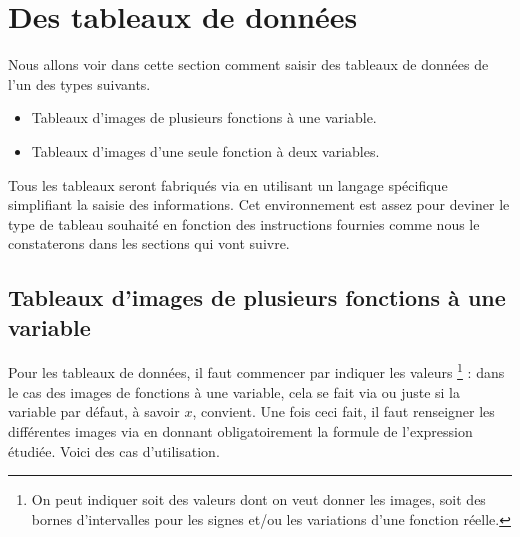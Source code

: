\newpage
\tableofcontents
\newpage
\section{Des tableaux de données}

Nous allons voir dans cette section comment saisir des tableaux de données de l'un des types suivants.
\begin{itemize}
	\item Tableaux d'images de plusieurs fonctions à une variable.

	\item Tableaux d'images d'une seule fonction à deux variables.
\end{itemize}


\begin{tdocnote}
	Tous les tableaux seront fabriqués via  en utilisant un langage spécifique simplifiant la saisie des informations.
	Cet environnement est assez  pour deviner le type de tableau souhaité en fonction des instructions fournies comme nous le constaterons dans les sections qui vont suivre.
\end{tdocnote}





\subsection{Tableaux d'images de plusieurs fonctions à une variable}

Pour les tableaux de données, il faut commencer par indiquer les valeurs 
\footnote{
	 On peut indiquer soit des valeurs dont on veut donner les images, soit des bornes d'intervalles pour les signes et/ou les variations d'une fonction réelle.
} :
dans le cas des images de fonctions à une variable, cela se fait via
ou juste
si la variable par défaut, à savoir $x$, convient.
Une fois ceci fait, il faut renseigner les différentes images via  en donnant obligatoirement la formule de l'expression étudiée.
Voici des cas d'utilisation.




\begin{tdocexa}
    \leavevmode

\end{tdocexa}



